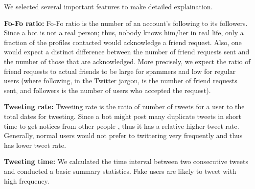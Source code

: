 \documentclass[a4paper, 12pt]{report}
\begin{document}
\noindent We selected several important features to make detailed explaination. \par

\noindent\textbf{Fo-Fo ratio:} Fo-Fo ratio is the number of an account's following to its followers. Since a bot is not a real person; thus, nobody knows him/her in real life, only a fraction of the proﬁles contacted would acknowledge a friend request. Also, one would expect a distinct diﬀerence between the number of friend requests sent and the number of those that are acknowledged. More precisely, we expect the ratio of friend requests to actual friends to be large for spammers and low for regular users (where following, in the Twitter jargon, is the number of friend requests sent, and followers is the number of users who accepted the request).

\noindent\textbf{Tweeting rate:} Tweeting rate is the ratio of number of tweets for a user to the total dates for tweeting. Since a bot might post many duplicate tweets in short time to get notices from other people , thus it has a relative higher tweet rate. Generally, normal users would not prefer to twittering very frequently and thus has lower tweet rate.

\noindent\textbf{Tweeting time:} We calculated the time interval between two consecutive tweets and conducted a basic summary statistics. Fake users are likely to tweet with high frequency.
\end{document}
